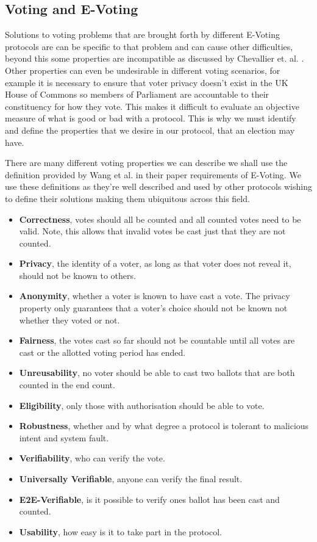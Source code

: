 \documentclass{entcs}
\begin{document}
\subsection{Voting and E-Voting}
Solutions to voting problems that are brought forth by different E-Voting protocols are can be specific to that problem and can cause other difficulties, beyond this some properties are incompatible as discussed by Chevallier et. al. \cite{Chevallier-mames06onsome}. Other properties can even be undesirable in different voting scenarios, for example it is necessary to ensure that voter privacy doesn't exist in the UK House of Commons so members of Parliament are accountable to their constituency for how they vote. This makes it difficult to evaluate an objective measure of what is good or bad with a protocol. This is why we must identify and define the properties that we desire in our protocol, that an election may have.

There are many different voting properties we can describe we shall use the definition provided by Wang et al. \cite{RequirementOfEVoting} in their paper requirements of E-Voting. We use these definitions as they're well described and used by other protocols wishing to define their solutions making them ubiquitous across this field.
\begin{itemize}
  \item {\bfseries Correctness}, votes should all be counted and all counted votes need to be valid. Note, this allows that invalid votes be cast just that they are not counted.
  \item {\bfseries Privacy}, the identity of a voter, as long as that voter does not reveal it, should not be known to others.
  \item {\bfseries Anonymity}, whether a voter is known to have cast a vote. The privacy property only guarantees that a voter's choice should not be known not whether they voted or not.
  \item {\bfseries Fairness}, the votes cast so far should not be countable until all votes are cast or the allotted voting period has ended.
  \item {\bfseries Unreusability}, no voter should be able to cast two ballots that are both counted in the end count.
  \item {\bfseries Eligibility}, only those with authorisation should be able to vote.
  \item {\bfseries Robustness}, whether and by what degree a protocol is tolerant to malicious intent and system fault.
  \item {\bfseries Verifiability}, who can verify the vote.
  \item {\bfseries Universally Verifiable}, anyone can verify the final result. 
  \item {\bfseries E2E-Verifiable}, is it possible to verify ones ballot has been cast and counted.
  \item {\bfseries Usability}, how easy is it to take part in the protocol.
\end{itemize}
\end{document}
